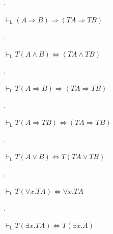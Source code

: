 \documentclass[10pt,a4paper]{article}
\begin{document}
 
 
\par{}. 
 
$\vdash_{\mathsf{L}}(A\mathbin{\Rightarrow}B)\mathbin{\Rightarrow}(TA\mathbin{\Rightarrow}TB)$\par
 
 
 
\par{}. 
 
$\vdash_{\mathsf{L}}T(A\mathbin{\wedge}B)\Leftrightarrow(TA\mathbin{\wedge}TB)$\par
 
 
 
\par{}. 
 
$\vdash_{\mathsf{L}}T(A\mathbin{\Rightarrow}B)\mathbin{\Rightarrow}(TA\mathbin{\Rightarrow}TB)$\par
 
 
 
\par{}. 
 
$\vdash_{\mathsf{L}}T(A\mathbin{\Rightarrow}TB)\Leftrightarrow(TA\mathbin{\Rightarrow}TB)$\par
 
 
 
\par{}. 
 
$\vdash_{\mathsf{L}}T(A\mathbin{\vee}B)\Leftrightarrow T(TA\mathbin{\vee}TB)$\par
 
 
 
\par{}. 
 
$\vdash_{\mathsf{L}}T({\forall}x.TA)\Leftrightarrow{\forall}x.TA$\par
 
 
 
\par{}. 
 
$\vdash_{\mathsf{L}}T({\exists}x.TA)\Leftrightarrow T({\exists}x.A)$\par
 
 
  
 
 
\end{document}
